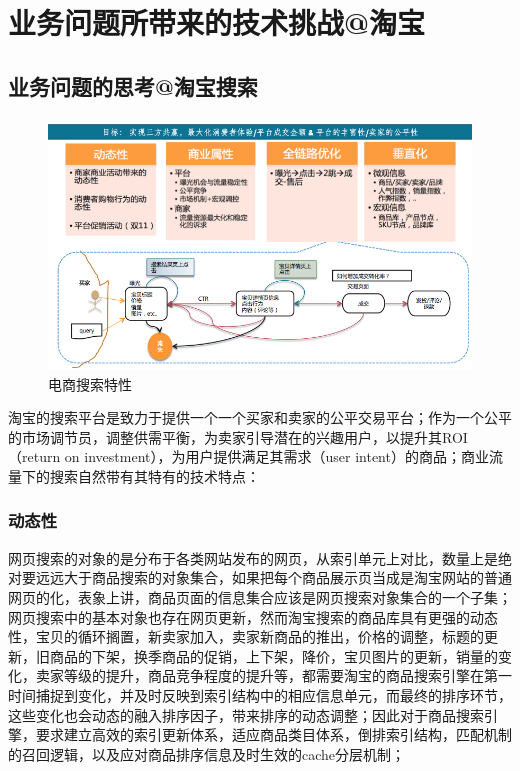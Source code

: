 
\chapter{ 业务问题所带来的技术挑战@淘宝 }
\thispagestyle{empty}

\setlength{\fboxrule}{0pt}\setlength{\fboxsep}{0cm}
\noindent\shadowbox{
\begin{tcolorbox}[arc=0mm,colback=lightblue,colframe=darkblue,title=学习目标与要求]

\end{tcolorbox}}
\setlength{\fboxrule}{1pt}\setlength{\fboxsep}{4pt} 

\section{业务问题的思考@淘宝搜索} 

\begin{figure}[h]
\centering
\includegraphics[totalheight=3.0in]{fig/searchProdFea.png}
\caption{电商搜索特性} \label{fig:gansamples}
\end{figure}

淘宝的搜索平台是致力于提供一个一个买家和卖家的公平交易平台；作为一个公平的市场调节员，调整供需平衡，为卖家引导潜在的兴趣用户，以提升其ROI（return on investment），为用户提供满足其需求（user intent）的商品；商业流量下的搜索自然带有其特有的技术特点：

\subsection{动态性}

网页搜索的对象的是分布于各类网站发布的网页，从索引单元上对比，数量上是绝对要远远大于商品搜索的对象集合，如果把每个商品展示页当成是淘宝网站的普通网页的化，表象上讲，商品页面的信息集合应该是网页搜索对象集合的一个子集；网页搜索中的基本对象也存在网页更新，然而淘宝搜索的商品库具有更强的动态性，宝贝的循环搁置，新卖家加入，卖家新商品的推出，价格的调整，标题的更新，旧商品的下架，换季商品的促销，上下架，降价，宝贝图片的更新，销量的变化，卖家等级的提升，商品竞争程度的提升等，都需要淘宝的商品搜索引擎在第一时间捕捉到变化，并及时反映到索引结构中的相应信息单元，而最终的排序环节，这些变化也会动态的融入排序因子，带来排序的动态调整；因此对于商品搜索引擎，要求建立高效的索引更新体系，适应商品类目体系，倒排索引结构，匹配机制的召回逻辑，以及应对商品排序信息及时生效的cache分层机制；

